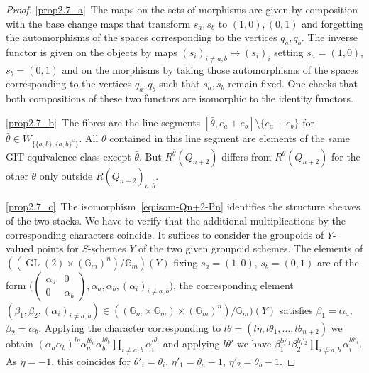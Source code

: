 \documentclass[ALCO,ThmDefs,Unicode,epreuves]{cedram}
\def\G{\mathds G}
\DeclareMathOperator{\GL}{GL}
\begin{document}
\begin{proof}
\ref{prop2.7_a}~The maps on the sets of morphisms are given by
composition with the base change maps that transform $s_a,s_b$ to $(1,0),(0,1)$
and forgetting the automorphisms of the spaces corresponding to the vertices $q_a,q_b$.
The inverse functor is given on the objects by maps $(s_i)_{i\neq a,b}\mapsto(s_i)_i$
setting $s_a=(1,0)$, $s_b=(0,1)$ and on the morphisms by taking those
automorphisms of the spaces corresponding to the vertices $q_a,q_b$ such that
$s_a,s_b$ remain fixed. One checks that both compositions of these
two functors are isomorphic to the identity functors.

\ref{prop2.7_b}~The fibres are the line segments $[\bar{\theta},e_a+e_b]\setminus\{e_a+e_b\}$
for $\bar{\theta}\in W_{\{\{a,b\},\{a,b\}^\complement\}}$.
All $\theta$ contained in this line segment are elements of the same GIT equivalence class 
except $\bar{\theta}$. But $R^{\bar{\theta}}(Q_{n+2})$ differs from 
$R^\theta(Q_{n+2})$ for the other $\theta$ only outside $R(Q_{n+2})_{a,b}$.

\ref{prop2.7_c}~The isomorphism~\eqref{eq:isom-Qn+2-Pn} identifies the structure sheaves of the 
two stacks. We have to verify that the additional multiplications by the corresponding 
characters coincide. It suffices to consider the groupoids of $Y$-valued points for 
$S$-schemes $Y$ of the two given groupoid schemes. The elements of 
$((\GL(2)\times(\G_m)^n)/\G_m)(Y)$ fixing $s_a=(1,0)$, $s_b=(0,1)$ are of the 
form $\Big(\left(\begin{smallmatrix}\alpha_a&0\\0&\alpha_b\end{smallmatrix}\right),
\alpha_a,\alpha_b,(\alpha_i)_{i\neq a,b}\Big)$,
the corresponding element
$(\beta_1,\beta_2,(\alpha_i)_{i\neq a,b})\in((\G_m\times\G_m)\times(\G_m)^n)/\G_m)(Y)$ 
satisfies $\beta_1=\alpha_a$, $\beta_2=\alpha_b$.
Applying the character corresponding to 
$l\theta=(l\eta,l\theta_1,\ldots,l\theta_{n+2})$ we obtain
$(\alpha_a\alpha_b)^{l\eta}\alpha_a^{l\theta_a}\alpha_b^{l\theta_b}
\prod_{i\neq a,b}\alpha_i^{l\theta_i}$ and applying $l\theta'$ we have 
$\beta_1^{l\eta'_1}\beta_2^{l\eta'_2}\prod_{i\neq a,b}\alpha_i^{l\theta'_i}$.
As $\eta=-1$, this coincides for $\theta'_i=\theta_i$, $\eta'_1=\theta_a-1$,
$\eta'_2=\theta_b-1$.
\end{proof}

\end{document}
